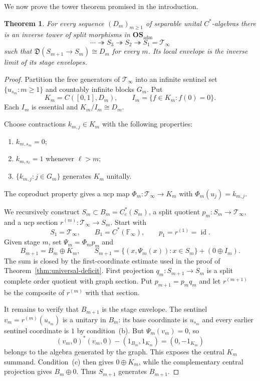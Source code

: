 \documentclass[11pt,a4paper]{amsart}
\theoremstyle{plain}
\newtheorem{theorem}{Theorem}[section]
\theoremstyle{definition}
\newcommand{\Ce}{C_e^*}
\newcommand{\OSadm}{\mathbf{OS}_{\mathrm{adm}}}
\newcommand{\Def}{\mathfrak D}
\newcommand{\id}{\operatorname{id}}
\begin{document}
We now prove the tower theorem promised in the introduction.

\begin{theorem}\label{thm:prescribed-tower}
For every sequence $(D_m)_{m\geq1}$ of separable unital $C^*$-algebras there is an inverse tower
of split morphisms in $\OSadm$
\[
 \cdots\twoheadrightarrow S_3\twoheadrightarrow S_2
 \twoheadrightarrow S_1=\mathcal T_\infty
\]
such that $\Def(S_{m+1}\to S_m)\cong D_m$ for every $m$.  Its local envelope is the inverse limit
of its stage envelopes.
\end{theorem}

\begin{proof}
Partition the free generators of $\mathcal T_\infty$ into an infinite sentinel set
$\{u_{s_m}:m\geq1\}$ and countably infinite blocks $G_m$.  Put
\[
 K_m=C([0,1],D_m),\qquad I_m=\{f\in K_m:f(0)=0\}.
\]
Each $I_m$ is essential and $K_m/I_m\cong D_m$.

Choose contractions $k_{m,j}\in K_m$ with the following properties:
\begin{enumerate}[label=\textup{(\alph*)}]
\item $k_{m,s_m}=0$;
\item $k_{m,s_\ell}=1$ whenever $\ell>m$;
\item $\{k_{m,j}:j\in G_m\}$ generates $K_m$ unitally.
\end{enumerate}
The coproduct property gives a ucp map
$\Phi_m:\mathcal T_\infty\to K_m$ with $\Phi_m(u_j)=k_{m,j}$.

We recursively construct $S_m\subset B_m=\Ce(S_m)$, a split quotient
$p_m:S_m\to\mathcal T_\infty$, and a ucp section
$r^{(m)}:\mathcal T_\infty\to S_m$.  Start with
\[
 S_1=\mathcal T_\infty,\qquad B_1=C^*(\mathbb F_\infty),\qquad
 p_1=r^{(1)}=\id.
\]
Given stage $m$, set $\Psi_m=\Phi_m p_m$ and
\begin{equation}\label{eq:tower-step}
 B_{m+1}=B_m\oplus K_m,\qquad
 S_{m+1}=\{(x,\Psi_m(x)):x\in S_m\}+(0\oplus I_m).
\end{equation}
The sum is closed by the first-coordinate estimate used in the proof of
Theorem~\ref{thm:universal-deficit}.  First projection
$q_m:S_{m+1}\to S_m$ is a split complete order quotient with graph section.  Put
$p_{m+1}=p_mq_m$ and let $r^{(m+1)}$ be the composite of $r^{(m)}$ with that section.

It remains to verify that $B_{m+1}$ is the stage envelope.  The sentinel
$v_m=r^{(m)}(u_{s_m})$ is a unitary in $B_m$: its base coordinate is $u_{s_m}$ and every earlier
sentinel coordinate is $1$ by condition~(b).  But $\Psi_m(v_m)=0$, so
\[
 (v_m,0)^*(v_m,0)-(1_{B_m},1_{K_m})=(0,-1_{K_m})
\]
belongs to the algebra generated by the graph.  This exposes the central $K_m$ summand.
Condition~(c) then gives $0\oplus K_m$, while the complementary central projection gives
$B_m\oplus0$.  Thus $S_{m+1}$ generates $B_{m+1}$.


\end{proof}
\end{document}
